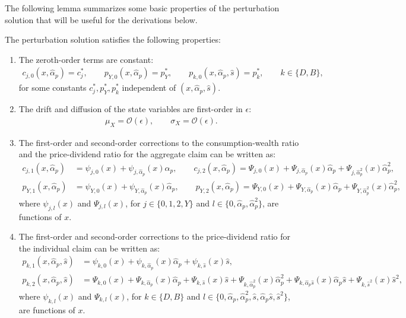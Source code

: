 The following lemma summarizes some basic properties of the perturbation solution that will be useful for the derivations below.
\begin{lemma}\label{lemma:basic_properties}
    The perturbation solution satisfies the following properties:
    \begin{enumerate}   
        \item The zeroth-order terms are constant:
        \begin{align}
            c_{j,0}(x, \hat{\alpha}_p) = c_{j}^*, \qquad 
            p_{Y,0}(x, \hat{\alpha}_p) = p_{Y}^*, \qquad 
            p_{k,0}(x, \hat{\alpha}_p, \hat{s}) = p_{k}^*, \qquad k \in \{D,B\},
        \end{align}
        for some constants $c_{j}^*, p_{Y}^*, p_{k}^*$ independent of $(x, \hat{\alpha}_p, \hat{s})$.
        \item The drift and diffusion of the state variables are first-order in $\epsilon$:
        \begin{align}
            \mu_{X} = \mathcal{O}(\epsilon), \qquad 
            \sigma_{X} = \mathcal{O}(\epsilon).
        \end{align}
        \item The first-order and second-order corrections to the consumption-wealth ratio and the price-dividend ratio for the aggregate claim can be written as:\small
        \begin{align}
            c_{j,1}(x, \hat{\alpha}_p) &= \psi_{j,0}(x) + \psi_{j,\hat{\alpha}_p}(x) \hat{\alpha}_p, \qquad 
            c_{j,2}(x, \hat{\alpha}_p) = \Psi_{j,0}(x) + \Psi_{j,\hat{\alpha}_p}(x) \hat{\alpha}_p + \Psi_{j,\hat{\alpha}_p^2}(x) \hat{\alpha}_p^2, \\
            p_{Y,1}(x, \hat{\alpha}_p) &= \psi_{Y,0}(x) + \psi_{Y,\hat{\alpha}_p}(x) \hat{\alpha}_p, \qquad 
            p_{Y,2}(x, \hat{\alpha}_p) = \Psi_{Y,0}(x) + \Psi_{Y,\hat{\alpha}_p}(x) \hat{\alpha}_p + \Psi_{Y,\hat{\alpha}_p^2}(x) \hat{\alpha}_p^2,
        \end{align}\normalsize
        where $\psi_{j,l}(x)$ and $\Psi_{j,l}(x)$, for $j\in\{0,1,2,Y\}$ and $l\in\{0,\hat{\alpha}_p,\hat{\alpha}_p^2\}$, are functions of $x$.


        \item The first-order and second-order corrections to the price-dividend ratio for the individual claim can be written as:\small
        \begin{align}
            p_{k,1}(x, \hat{\alpha}_p, \hat{s}) &= \psi_{k,0}(x) + \psi_{k,\hat{\alpha}_p}(x) \hat{\alpha}_p + \psi_{k,\hat{s}}(x) \hat{s}, \\
            p_{k,2}(x, \hat{\alpha}_p, \hat{s}) &= \Psi_{k,0}(x) + \Psi_{k,\hat{\alpha}_p}(x) \hat{\alpha}_p + \Psi_{k,\hat{s}}(x) \hat{s} + \Psi_{k,\hat{\alpha}_p^2}(x) \hat{\alpha}_p^2 + \Psi_{k,\hat{\alpha}_p \hat{s}}(x) \hat{\alpha}_p \hat{s} + \Psi_{k,\hat{s}^2}(x) \hat{s}^2,
        \end{align}\normalsize
        where $\psi_{k,l}(x)$ and $\Psi_{k,l}(x)$, for $k\in\{D,B\}$ and $l\in\{0,\hat{\alpha}_p,\hat{\alpha}_p^2,\hat{s},\hat{\alpha}_p \hat{s},\hat{s}^2\}$, are functions of $x$.


\end{enumerate}
\end{lemma}
